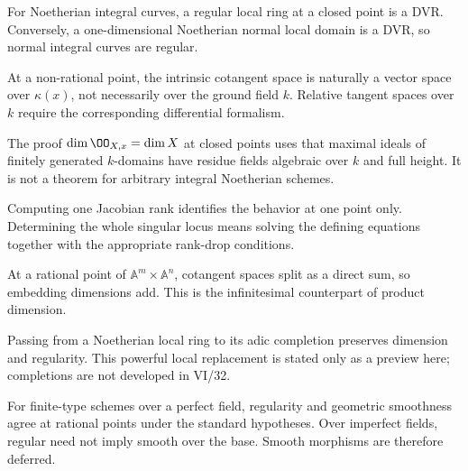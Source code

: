 \begin{example}\label{ex:vi32-adv-08}
For Noetherian integral curves, a regular local ring at a closed point is a DVR. Conversely, a one-dimensional Noetherian normal local domain is a DVR, so normal integral curves are regular.
\end{example}

\begin{example}\label{ex:vi32-adv-09}
At a non-rational point, the intrinsic cotangent space is naturally a vector space over $\kappa(x)$, not necessarily over the ground field $k$. Relative tangent spaces over $k$ require the corresponding differential formalism.
\end{example}

\begin{example}\label{ex:vi32-adv-10}
The proof $\dim\OO_{X,x}=\dim X$ at closed points uses that maximal ideals of finitely generated $k$-domains have residue fields algebraic over $k$ and full height. It is not a theorem for arbitrary integral Noetherian schemes.
\end{example}

\begin{example}\label{ex:vi32-adv-11}
Computing one Jacobian rank identifies the behavior at one point only. Determining the whole singular locus means solving the defining equations together with the appropriate rank-drop conditions.
\end{example}

\begin{example}\label{ex:vi32-adv-12}
At a rational point of $\mathbb A^m\times\mathbb A^n$, cotangent spaces split as a direct sum, so embedding dimensions add. This is the infinitesimal counterpart of product dimension.
\end{example}

\begin{example}\label{ex:vi32-adv-13}
Passing from a Noetherian local ring to its adic completion preserves dimension and regularity. This powerful local replacement is stated only as a preview here; completions are not developed in VI/32.
\end{example}

\begin{example}\label{ex:vi32-adv-14}
For finite-type schemes over a perfect field, regularity and geometric smoothness agree at rational points under the standard hypotheses. Over imperfect fields, regular need not imply smooth over the base. Smooth morphisms are therefore deferred.
\end{example}
